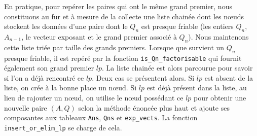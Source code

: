 En pratique, pour repérer les paires qui ont le même grand premier, nous
constituons au fur et à mesure de la collecte une liste chainée dont les nœuds
stockent les données d'une paire dont le $Q_n$ est presque friable (les entiers
$Q_n$, $A_{n-1}$, le vecteur exposant et le grand premier associé à $Q_n$).
Nous maintenons cette liste triée par taille des grands premiers. Lorsque que
survient un $Q_n$ presque friable, il est repéré par la fonction
\texttt{is\_Qn\_factorisable} qui fournit également son grand premier $lp$. La
liste chainée est alors parcourue pour savoir si l'on a déjà rencontré ce $lp$.
Deux cas se présentent alors. Si $lp$ est absent de la liste, on crée à la
bonne place un nœud. Si $lp$ est déjà présent dans la liste, au lieu de
rajouter un nœud, on utilise le nœud possédant ce $lp$ pour obtenir une
nouvelle paire $(A,Q)$ selon la méthode énoncée plus haut et ajoute ses
composantes aux tableaux \texttt{Ans}, \texttt{Qns} et \texttt{exp\_vects}. La
fonction \texttt{insert\_or\_elim\_lp} se charge de cela. \\

